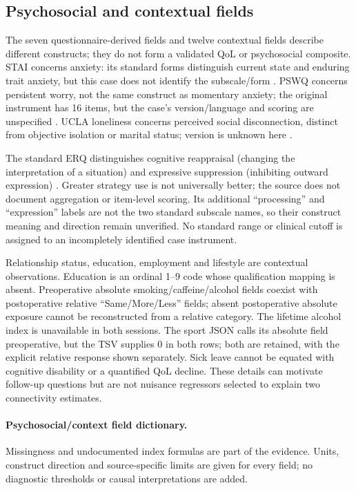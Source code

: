 \documentclass[11pt,a4paper]{article}
\begin{document}
\clearpage\subsection{Psychosocial and contextual fields}\label{app:psych}
The seven questionnaire-derived fields and twelve contextual fields describe different constructs; they do not form a validated QoL or psychosocial composite. STAI concerns anxiety: its standard forms distinguish current state and enduring trait anxiety, but this case does not identify the subscale/form \citep{staidocs}. PSWQ concerns persistent worry, not the same construct as momentary anxiety; the original instrument has 16 items, but the case's version/language and scoring are unspecified \citep{meyer1990}. UCLA loneliness concerns perceived social disconnection, distinct from objective isolation or marital status; version is unknown here \citep{russell1996}.

The standard ERQ distinguishes cognitive reappraisal (changing the interpretation of a situation) and expressive suppression (inhibiting outward expression) \citep{gross2003}. Greater strategy use is not universally better; the source does not document aggregation or item-level scoring. Its additional ``processing'' and ``expression'' labels are not the two standard subscale names, so their construct meaning and direction remain unverified. No standard range or clinical cutoff is assigned to an incompletely identified case instrument.

Relationship status, education, employment and lifestyle are contextual observations. Education is an ordinal 1--9 code whose qualification mapping is absent. Preoperative absolute smoking/caffeine/alcohol fields coexist with postoperative relative ``Same/More/Less'' fields; absent postoperative absolute exposure cannot be reconstructed from a relative category. The lifetime alcohol index is unavailable in both sessions. The sport JSON calls its absolute field preoperative, but the TSV supplies 0 in both rows; both are retained, with the explicit relative response shown separately. Sick leave cannot be equated with cognitive disability or a quantified QoL decline. These details can motivate follow-up questions but are not nuisance regressors selected to explain two connectivity estimates.

\small\normalsize
\paragraph{Psychosocial/context field dictionary.} Missingness and undocumented index formulas are part of the evidence. Units, construct direction and source-specific limits are given for every field; no diagnostic thresholds or causal interpretations are added.
{\fontsize{9.5}{11}\selectfont}
\end{document}
